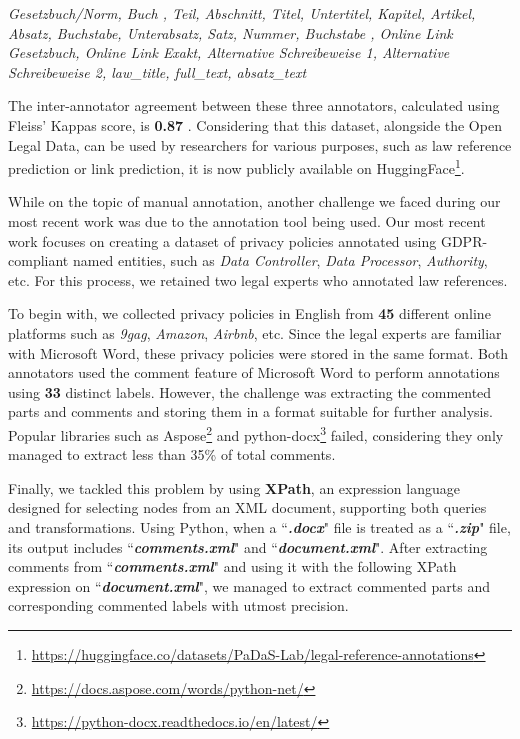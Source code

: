 \documentclass{IOS-Book-Article}
\begin{document}
\begin{mdframed}
{\textit{Gesetzbuch/Norm, Buch , Teil, Abschnitt, Titel, Untertitel, Kapitel, Artikel, Absatz, Buchstabe, Unterabsatz, Satz, Nummer, Buchstabe , Online Link Gesetzbuch, Online Link Exakt, Alternative Schreibeweise 1, Alternative Schreibeweise 2, law\_title, full\_text, absatz\_text}}
\end{mdframed}

The inter-annotator agreement between these three annotators, calculated using Fleiss’ Kappas score, is \textbf{0.87} \cite{r13}. Considering that this dataset, alongside the Open Legal Data, can be used by researchers for various purposes, such as law reference prediction or link prediction, it is now publicly available on HuggingFace\footnote{\url{https://huggingface.co/datasets/PaDaS-Lab/legal-reference-annotations}}.

While on the topic of manual annotation, another challenge we faced during our most recent work was due to the annotation tool being used. Our most recent work focuses on creating a dataset of privacy policies annotated using GDPR-compliant named entities, such as \textit{Data Controller}, \textit{Data Processor}, \textit{Authority}, etc. For this process, we retained two legal experts who annotated law references.

To begin with, we collected privacy policies in English from \textbf{45} different online platforms such as \textit{9gag}, \textit{Amazon}, \textit{Airbnb}, etc. Since the legal experts are familiar with Microsoft Word, these privacy policies were stored in the same format. Both annotators used the comment feature of Microsoft Word to perform annotations using \textbf{33} distinct labels. However, the challenge was extracting the commented parts and comments and storing them in a format suitable for further analysis. Popular libraries such as Aspose\footnote{\url{https://docs.aspose.com/words/python-net/}} and python-docx\footnote{\url{https://python-docx.readthedocs.io/en/latest/}} failed, considering they only managed to extract less than 35\% of total comments.

Finally, we tackled this problem by using \textbf{XPath}, an expression language designed for selecting nodes from an XML document, supporting both queries and transformations. Using Python, when a ``\textbf{\textit{.docx}}" file is treated as a ``\textbf{\textit{.zip}}" file, its output includes ``\textbf{\textit{comments.xml}}" and ``\textbf{\textit{document.xml}}". After extracting comments from ``\textbf{\textit{comments.xml}}" and using it with the following XPath expression on ``\textbf{\textit{document.xml}}", we managed to extract commented parts and corresponding commented labels with utmost precision.
\end{document}
